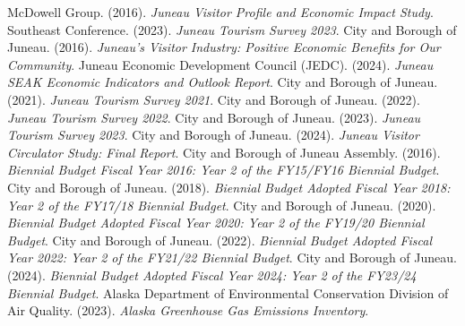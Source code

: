 
\begin{thebibliography}{99}
   McDowell Group. (2016). \textit{ Juneau Visitor Profile and Economic Impact Study}. 
   Southeast Conference. (2023).  \textit{Juneau Tourism Survey 2023}. 
   City and Borough of Juneau. (2016).  \textit{Juneau’s Visitor Industry: Positive Economic Benefits for Our Community}. 
   Juneau Economic Development Council (JEDC). (2024).  \textit{Juneau SEAK Economic Indicators and Outlook Report}. 
   City and Borough of Juneau. (2021).  \textit{Juneau Tourism Survey 2021}. 
   City and Borough of Juneau. (2022).  \textit{Juneau Tourism Survey 2022}. 
   City and Borough of Juneau. (2023).  \textit{Juneau Tourism Survey 2023}. 
   City and Borough of Juneau. (2024).  \textit{Juneau Visitor Circulator Study: Final Report}. 
   City and Borough of Juneau Assembly. (2016).  \textit{Biennial Budget Fiscal Year 2016: Year 2 of the FY15/FY16 Biennial Budget}. 
   City and Borough of Juneau. (2018).  \textit{Biennial Budget Adopted Fiscal Year 2018: Year 2 of the FY17/18 Biennial Budget}. 
   City and Borough of Juneau. (2020).  \textit{Biennial Budget Adopted Fiscal Year 2020: Year 2 of the FY19/20 Biennial Budget}. 
   City and Borough of Juneau. (2022).  \textit{Biennial Budget Adopted Fiscal Year 2022: Year 2 of the FY21/22 Biennial Budget}. 
   City and Borough of Juneau. (2024).  \textit{Biennial Budget Adopted Fiscal Year 2024: Year 2 of the FY23/24 Biennial Budget}. 
  Alaska Department of Environmental Conservation Division of Air Quality. (2023). \textit{Alaska Greenhouse Gas Emissions Inventory}.
\end{thebibliography}
